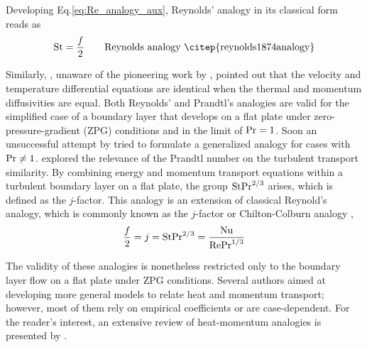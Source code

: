 Developing Eq.\eqref{eq:Re_analogy_aux}, Reynolds' analogy in its classical form reads as
\begin{equation}\label{eq:Re_analogy}
    \nSt = \frac{f}{2} \qquad \text{Reynolds analogy \citep{reynolds1874analogy}}
\end{equation}

Similarly, \citet{prandtl1910beziehung}, unaware of the pioneering work by \citet{reynolds1874analogy}, pointed out that the velocity and temperature differential equations are identical when the thermal and momentum diffusivities are equal. Both Reynolds' and Prandtl's analogies are valid for the simplified case of a boundary layer that develops on a flat plate under zero-pressure-gradient (ZPG) conditions and in the limit of $\mbox{$\mathrm{Pr}$} = 1$. Soon an unsuccessful attempt by \citet{taylor1916conditions} tried to formulate a generalized analogy for cases with $\mbox{$\mathrm{Pr}$} \neq 1$. \citet{colburn1933analogy} explored the relevance of the Prandtl number on the turbulent transport similarity. By combining energy and momentum transport equations within a turbulent boundary layer on a flat plate, the group $\mbox{$\mathrm{St}$}\mbox{$\mathrm{Pr}$}^{2/3}$ arises, which is defined as the $j$-factor. This analogy is an extension of classical Reynold's analogy, which is commonly known as the $j$-factor or Chilton-Colburn analogy \citep{Chilton1934Jfactor},
\begin{equation}\label{q:jfacto_analogy}
    \frac{f}{2} = j = \mbox{$\mathrm{St}$}\mbox{$\mathrm{Pr}$}^{2/3} = \frac{\mbox{$\mathrm{Nu}$}}{\mbox{$\mathrm{Re}$}\mbox{$\mathrm{Pr}$}^{1/3}}
\end{equation}

The validity of these analogies is nonetheless restricted only to the boundary layer flow on a flat plate under ZPG conditions. Several authors aimed at developing more general models to relate heat and momentum transport; however, most of them rely on empirical coefficients or are case-dependent. For the reader's interest, an extensive review of heat-momentum analogies is presented by \citet{churchill1997critique}. %

